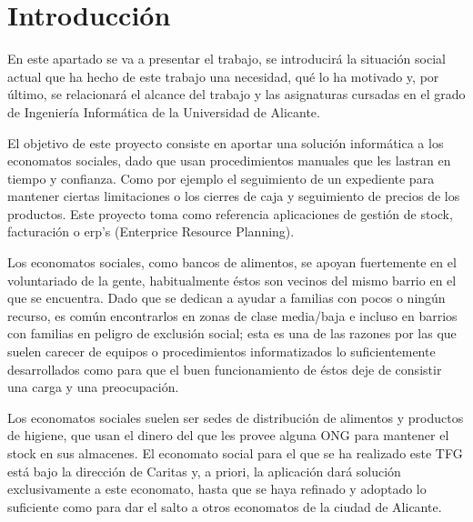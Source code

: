 
\chapter{Introducción}
En este apartado se va a presentar el trabajo, se introducirá la situación social actual que ha hecho de este trabajo una necesidad, qué lo ha motivado y, por último, se relacionará el alcance del trabajo y las asignaturas cursadas en el grado de Ingeniería Informática de la Universidad de Alicante.
\vspace{1em}
\par El objetivo de este proyecto consiste en aportar una solución informática a los economatos sociales, dado que usan procedimientos manuales que les lastran en tiempo y confianza. Como por ejemplo el seguimiento de un expediente para mantener ciertas limitaciones o los cierres de caja y seguimiento de precios de los productos. Este proyecto toma como referencia aplicaciones de gestión de stock, facturación o erp's (Enterprice Resource Planning).
\vspace{1em}
\par Los economatos sociales, como bancos de alimentos, se apoyan fuertemente en el voluntariado de la gente, habitualmente éstos son vecinos del mismo barrio en el que se encuentra. Dado que se dedican a ayudar a familias con pocos o ningún recurso, es común encontrarlos en zonas de clase media/baja e incluso en barrios con familias en peligro de exclusión social; esta es una de las razones por las que suelen carecer de equipos o procedimientos informatizados lo suficientemente desarrollados como para que el buen funcionamiento de éstos deje de consistir una carga y una preocupación.
\vspace{1em}
\par Los economatos sociales suelen ser sedes de distribución de alimentos y productos de higiene, que usan el dinero del que les provee alguna ONG para mantener el stock en sus almacenes. El economato social para el que se ha realizado este TFG está bajo la dirección de Caritas y, a priori, la aplicación dará solución exclusivamente a este economato, hasta que se haya refinado y adoptado lo suficiente como para dar el salto a otros economatos de la ciudad de Alicante.
